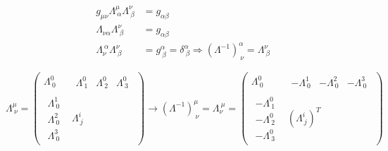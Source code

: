 \documentclass[../../main/main.tex]{subfiles}
\begin{document}
\begin{align*}
	g_{\mu \nu} \Lambda^{\mu}_{\ \alpha} \Lambda^{\nu}_{\ \beta} &= g_{\alpha \beta}	\\
	\Lambda _{\nu \alpha} \Lambda^{\nu}_{\ \beta} &= g_{\alpha \beta} \\
	\Lambda _{\nu}^{\ \alpha} \Lambda^{\nu}_{\ \beta} &= g^{\alpha}_{\ \beta} = \delta^{\alpha}_{\ \beta} \Longrightarrow (\Lambda ^{-1})^{\alpha}_{\ \nu} = \Lambda^{\nu}_{\ \beta}
\end{align*}

\begin{equation*}
	\Lambda^{\mu}_{\ \nu} =
	\left(
	\begin{array}{c|c}
		\Lambda^{0}_{\ 0} &	\begin{matrix} \Lambda^{0}_{\ 1} & \Lambda^{0}_{\ 2} & \Lambda^{0}_{\ 3} \end{matrix}	\\
		\hline
		\begin{matrix} \Lambda^{1}_{\ 0} \\ \Lambda^{2}_{\ 0} \\ \Lambda^{3}_{\ 0} \end{matrix}	&	\Lambda^{i}_{\ j}
	\end{array}
	\right)
	\longrightarrow (\Lambda ^{-1})^{\mu}_{\ \nu} = \Lambda_{\nu}^{\ \mu } =
	\left(
	\begin{array}{c|c}
		\Lambda^{0}_{\ 0} &	\begin{matrix} -\Lambda^{1}_{\ 0} & -\Lambda^{2}_{\ 0} & -\Lambda^{3}_{\ 0} \end{matrix}	\\
		\hline
		\begin{matrix} -\Lambda^{0}_{\ 1} \\ -\Lambda^{0}_{\ 2} \\ -\Lambda^{0}_{\ 3} \end{matrix}	&	(\Lambda^{i}_{\ j})^T
	\end{array}
	\right)
\end{equation*}
\end{document}

